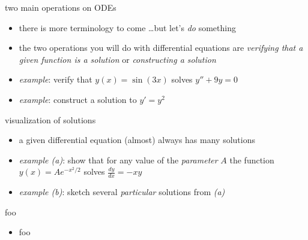 \documentclass{beamer}
\begin{document}
\begin{frame}{two main operations on ODEs}

\begin{itemize}
\item there is more terminology to come \dots but let's \emph{do} something
\item the two operations you will do with differential equations are \emph{verifying that a given function is a solution} or \emph{constructing a solution}
\item \emph{example}:  verify that $y(x) = \sin(3 x)$ solves $y''+9y=0$

\vspace{10mm}
\item \emph{example}:  construct a solution to $y'=y^2$

\vspace{10mm}
\end{itemize}
\end{frame}

\begin{frame}{visualization of solutions}

\begin{itemize}
\item a given differential equation (almost) always has many solutions
\item \emph{example (a)}: show that for any value of the \emph{parameter} $A$ the function $y(x) = A e^{-x^2/2}$ solves $\frac{dy}{dx} = - x y$

\vspace{15mm}
\item \emph{example (b)}: sketch several \emph{particular} solutions from \emph{(a)}

\vspace{25mm}

\phantom{foo}
\end{itemize}
\end{frame}

\begin{frame}{foo}

\begin{itemize}
\item foo
\end{itemize}
\end{frame}
\end{document}
